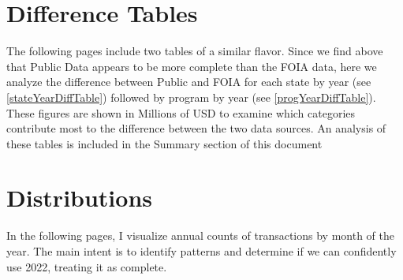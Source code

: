\documentclass{article}
\begin{document}
\section*{Difference Tables}
The following pages include two tables of a similar flavor. Since we find above that Public Data appears to be more complete than 
the FOIA data, here we analyze the difference between Public and FOIA for each state by year (see \autoref{stateYearDiffTable}) 
followed by program by year (see \autoref{progYearDiffTable}). These figures are shown in Millions of USD to 
examine which categories contribute most to the difference between the two data sources. An analysis of these tables 
is included in the Summary section of this document

\begin{landscape}
    \small
    
\end{landscape}

\newpage
\begin{landscape}
    \scriptsize
    
\end{landscape}


\newpage
\section*{Distributions}
In the following pages, I visualize annual counts of transactions by month of the year. The main intent is to identify patterns and determine if we can 
confidently use 2022, treating it as complete. 
\end{document}
